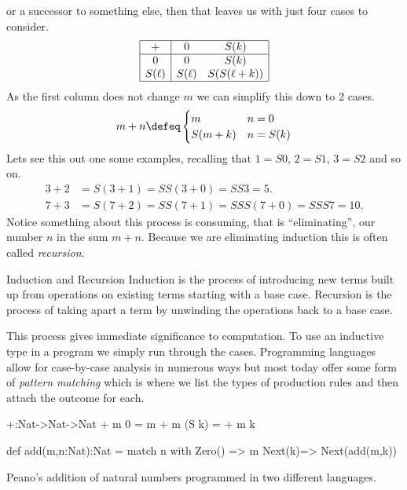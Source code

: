 or a successor to something else, then that leaves us with just four cases 
to consider.
\begin{align*}
    \begin{array}{|c|cc|}
        \hline 
        + & 0 & S(k)\\
        \hline 
        0 & 0 & S(k) \\
        S(\ell) & S(\ell) & S(S(\ell+k))\\
        \hline
    \end{array}
\end{align*}
As the first column does not change $m$ we can simplify this down to 2 cases.
\begin{align*}
    m+n \defeq \begin{cases} m & n=0\\ S(m+k) & n=S(k)\end{cases}
\end{align*}
Lets see this out one some examples, recalling that $1=S0$, $2=S1$, $3=S2$ and so on.
\begin{align*}
    3+2 & = S(3+1)= SS(3+0) = SS3=5.\\
    7+3 & = S(7+2) = SS(7+1) = SSS(7+0)=SSS7=10.
\end{align*}
Notice something about this process is consuming, that is ``eliminating'',
our number $n$ in the sum $m+n$.  Because we are eliminating induction this 
is often called \emph{recursion}.

\begin{remark}{Induction and Recursion}
    Induction is the process of introducing new terms built up 
    from operations on existing terms starting with a base case.
    Recursion is the process of taking apart a term by unwinding 
    the operations back to a base case.
\end{remark}


This process gives immediate significance to computation.
To use an inductive type in a program we simply run through the cases.
Programming languages allow for case-by-case analysis in numerous ways 
but most today offer some form of \emph{pattern matching} which is 
where we list the types of production rules and then attach the outcome 
for each.
\begin{lstfloat}
\begin{center}
\begin{minipage}{0.4\textwidth}
\begin{Fcode}[]
+:Nat->Nat->Nat
+ m  0    = m
+ m (S k) = + m k
\end{Fcode}
\end{minipage}
\hfill
\begin{minipage}{0.59\textwidth}
\begin{Pcode}[]
def add(m,n:Nat):Nat =
  match n with 
    Zero() => m
    Next(k)=> Next(add(m,k))
\end{Pcode}
\end{minipage}
\end{center}
\caption{Peano's addition of natural numbers programmed in two different languages.}
\label{lst:peano}
\end{lstfloat}


